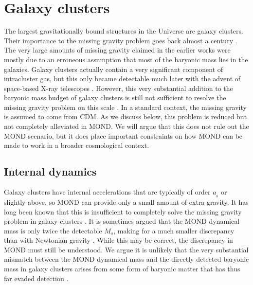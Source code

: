 \documentclass[fleqn,usenatbib,useAMS]{mnras} %
\begin{document}
\section{Galaxy clusters}
\label{Galaxy_clusters}

The largest gravitationally bound structures in the Universe are galaxy clusters. Their importance to the missing gravity problem goes back almost a century \citep{Zwicky_1933, Zwicky_1937}. The very large amounts of missing gravity claimed in the earlier works were mostly due to an erroneous assumption that most of the baryonic mass lies in the galaxies. Galaxy clusters actually contain a very significant component of intracluster gas, but this only became detectable much later with the advent of space-based X-ray telescopes \citep{Sarazin_1986}. However, this very substantial addition to the baryonic mass budget of galaxy clusters is still not sufficient to resolve the missing gravity problem on this scale \citep[for a review, see][]{Allen_2011}. In a standard context, the missing gravity is assumed to come from CDM. As we discuss below, this problem is reduced but not completely alleviated in MOND. We will argue that this does not rule out the MOND scenario, but it does place important constraints on how MOND can be made to work in a broader cosmological context.



\subsection{Internal dynamics}
\label{Galaxy_cluster_internal_dynamics}

Galaxy clusters have internal accelerations that are typically of order $a_{_0}$ or slightly above, so MOND can provide only a small amount of extra gravity. It has long been known that this is insufficient to completely solve the missing gravity problem in galaxy clusters \citep{Sanders_1999, Aguirre_2001, Sanders_2003}. It is sometimes argued that the MOND dynamical mass is only twice the detectable $M_s$, making for a much smaller discrepancy than with Newtonian gravity \citep[e.g.][]{Milgrom_2015}. While this may be correct, the discrepancy in MOND must still be understood. We argue it is unlikely that the very substantial mismatch between the MOND dynamical mass and the directly detected baryonic mass in galaxy clusters arises from some form of baryonic matter that has thus far evaded detection \citep[though see][]{Milgrom_2015}.
\end{document}
